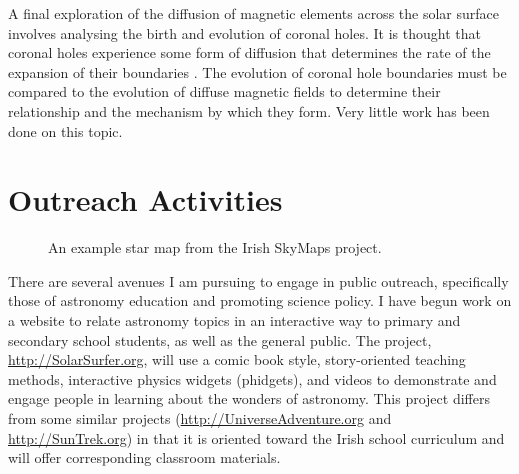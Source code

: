 A final exploration of the diffusion of magnetic elements across the solar surface involves analysing the birth and evolution of coronal holes. It is thought that coronal holes experience some form of diffusion that determines the rate of the expansion of their boundaries \citep{Krista:2011,Frisk:2005}. The evolution of coronal hole boundaries must be compared to the evolution of diffuse magnetic fields to determine their relationship and the mechanism by which they form. Very little work has been done on this topic.







\section{Outreach Activities}

\begin{figure}[!t]
\caption[An example star map.]{An example star map from the Irish SkyMaps project.}
\label{fig:starmap}
\end{figure}

There are several avenues I am pursuing to engage in public outreach, specifically those of  astronomy education and promoting science policy.
I have begun work on a website to relate astronomy topics in an interactive way to primary and secondary school students, as well as the general public. The project, \url{http://SolarSurfer.org},
will use a comic book style, story-oriented teaching methods, interactive physics widgets (phidgets), and videos to demonstrate and engage people in learning about the wonders of astronomy. This project differs from some similar projects (\url{http://UniverseAdventure.org} and \url{http://SunTrek.org}) in that it is oriented toward the Irish school curriculum and will offer corresponding classroom materials.

